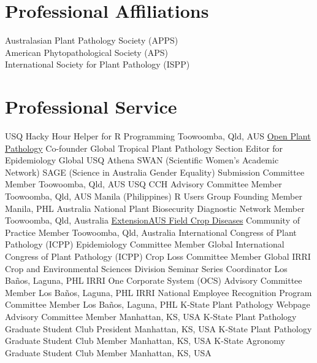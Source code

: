 
\section*{Professional Affiliations}
  Australasian Plant Pathology Society (APPS)\\[3 mm]
  American Phytopathological Society (APS)\\[3 mm]
  International Society for Plant Pathology (ISPP)\\

\section*{Professional Service}
\begin{entrylist}
    {USQ Hacky Hour}
    {Helper for R Programming}
    {Toowoomba, Qld, AUS}
    {\href{https://www.openplantpathology.org}{Open Plant Pathology}}
    {Co-founder}
    {Global}
    {Tropical Plant Pathology}
    {Section Editor for Epidemiology}
    {Global}
    {USQ Athena SWAN (Scientific Women’s Academic Network) SAGE (Science in Australia Gender Equality) Submission Committee}
    {Member}
    {Toowoomba, Qld, AUS}
    {USQ CCH Advisory Committee}
    {Member}
    {Toowoomba, Qld, AUS}
    {Manila (Philippines) R Users Group}
    {Founding Member}
    {Manila, PHL}
    {Australia National Plant Biosecurity Diagnostic Network}
    {Member}
    {Toowoomba, Qld, Australia}
    {\href{http://extensionaus.com.au/field-crop-diseases/}{ExtensionAUS Field Crop Diseases} Community of Practice}
    {Member}
    {Toowoomba, Qld, Australia}
    {International Congress of Plant Pathology (ICPP) Epidemiology Committee}
    {Member}
    {Global}
    {International Congress of Plant Pathology (ICPP) Crop Loss Committee}
    {Member}
    {Global}
    {IRRI Crop and Environmental Sciences Division Seminar Series}
    {Coordinator}
    {Los Ba\~nos, Laguna, PHL}
    {IRRI One Corporate System (OCS) Advisory Committee}
    {Member}
    {Los Ba\~nos, Laguna, PHL}
    {IRRI National Employee Recognition Program Committee}
    {Member}
    {Los Ba\~nos, Laguna, PHL}
    {K-State Plant Pathology Webpage Advisory Committee}
    {Member}
    {Manhattan, KS, USA}
    {K-State Plant Pathology Graduate Student Club}
    {President}
    {Manhattan, KS, USA}
    {K-State Plant Pathology Graduate Student Club}
    {Member}
    {Manhattan, KS, USA}
    {K-State Agronomy Graduate Student Club}
    {Member}
    {Manhattan, KS, USA}
\end{entrylist}
